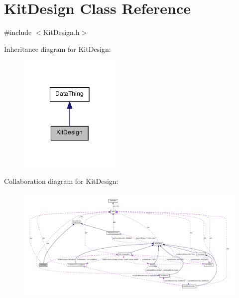 \hypertarget{class_kit_design}{
\section{KitDesign Class Reference}
\label{class_kit_design}
}


{\ttfamily \#include $<$KitDesign.h$>$}



Inheritance diagram for KitDesign:\nopagebreak
\begin{figure}[H]
\begin{center}
\leavevmode
\includegraphics[width=138pt]{class_kit_design__inherit__graph}
\end{center}
\end{figure}


Collaboration diagram for KitDesign:\nopagebreak
\begin{figure}[H]
\begin{center}
\leavevmode
\includegraphics[width=400pt]{class_kit_design__coll__graph}
\end{center}
\end{figure}
